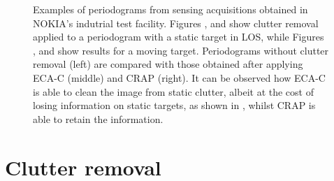 \begin{figure}[!t]
{	}\hfill
	\caption[]{\small Examples of periodograms from sensing acquisitions obtained in NOKIA's indutrial test facility.
		Figures ,  and  show clutter removal applied to a periodogram with a static target in LOS, while Figures ,  and  show results for a moving target.
		Periodograms without clutter removal (left) are compared with those obtained after applying ECA-C (middle) and CRAP (right). It can be observed how ECA-C is able to clean the image from static clutter, albeit at the cost of losing information on static targets, as shown in , whilst CRAP is able to retain the information.  }
	\label{fig:Rad_clutter_crap-ecac}
\end{figure}
\section{Clutter removal}
\label{sec:clutter_removal}

